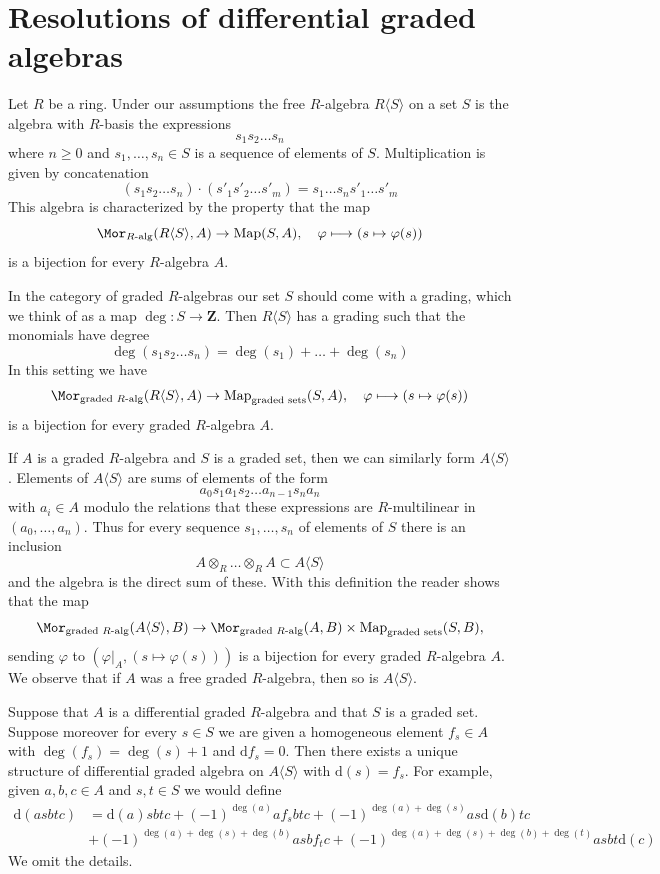 \section{Resolutions of differential graded algebras}
\label{dga-section-resolution-dgas}
Let $R$ be a ring. Under our assumptions the free $R$-algebra
$R\langle S \rangle$ on a set $S$ is the algebra with $R$-basis
the expressions
$$
s_1 s_2 \ldots s_n
$$
where $n \geq 0$ and $s_1, \ldots, s_n \in S$ is a sequence of
elements of $S$. Multiplication is given by concatenation
$$
(s_1 s_2 \ldots s_n) \cdot (s'_1 s'_2 \ldots s'_m) =
s_1 \ldots s_n s'_1 \ldots s'_m
$$
This algebra is characterized by the property that the map
$$
\Mor_{R\text{-alg}}(R\langle S \rangle, A) \to
\text{Map}(S, A),\quad
\varphi \longmapsto (s \mapsto \varphi(s))
$$
is a bijection for every $R$-algebra $A$.

\medskip\noindent
In the category of graded $R$-algebras our set $S$ should come
with a grading, which we think of as a map $\deg : S \to \mathbf{Z}$.
Then $R\langle S\rangle$ has a grading such that the monomials
have degree
$$
\deg(s_1 s_2 \ldots s_n) = \deg(s_1) + \ldots + \deg(s_n)
$$
In this setting we have
$$
\Mor_{\text{graded }R\text{-alg}}(R\langle S \rangle, A) \to
\text{Map}_{\text{graded sets}}(S, A),\quad
\varphi \longmapsto (s \mapsto \varphi(s))
$$
is a bijection for every graded $R$-algebra $A$.

\medskip\noindent
If $A$ is a graded $R$-algebra and $S$ is a graded set,
then we can similarly form $A\langle S \rangle$.
Elements of $A\langle S \rangle$ are
sums of elements of the form
$$
a_0 s_1 a_1 s_2 \ldots a_{n - 1} s_n a_n
$$
with $a_i \in A$ modulo the relations that these expressions
are $R$-multilinear in $(a_0, \ldots, a_n)$.
Thus for every sequence $s_1, \ldots, s_n$ of elements of $S$
there is an inclusion
$$
A \otimes_R \ldots \otimes_R A \subset A\langle S \rangle
$$
and the algebra is the direct sum of these. With this definition the
reader shows that the map
$$
\Mor_{\text{graded }R\text{-alg}}(A\langle S \rangle, B) \to
\Mor_{\text{graded }R\text{-alg}}(A, B) \times
\text{Map}_{\text{graded sets}}(S, B),
$$
sending $\varphi$ to $(\varphi|_A, (s \mapsto \varphi(s)))$
is a bijection for every graded $R$-algebra $A$.
We observe that if $A$ was a free graded $R$-algebra,
then so is $A\langle S \rangle$.

\medskip\noindent
Suppose that $A$ is a differential graded $R$-algebra and
that $S$ is a graded set. Suppose moreover for every $s \in S$
we are given a homogeneous element $f_s \in A$ with $\deg(f_s) = \deg(s) + 1$
and $\text{d}f_s = 0$. Then there exists a unique structure of
differential graded algebra on $A\langle S \rangle$ with
$\text{d}(s) = f_s$. For example, given $a, b, c \in A$ and
$s, t \in S$ we would define
\begin{align*}
\text{d}(asbtc)
& =
\text{d}(a)sbtc + (-1)^{\deg(a)}a f_s b t c +
(-1)^{\deg(a) + \deg(s)} as\text{d}(b)tc \\
& + (-1)^{\deg(a) + \deg(s) + \deg(b)} asb f_t c +
(-1)^{\deg(a) + \deg(s) + \deg(b) + \deg(t)} asbt\text{d}(c)
\end{align*}
We omit the details.

